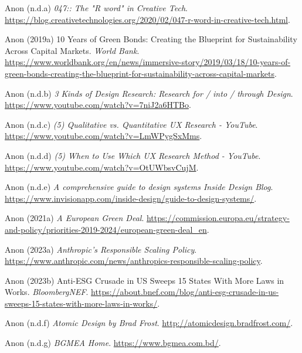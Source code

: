 \documentclass[
  letterpaper,
  DIV=11,
  numbers=noendperiod]{scrartcl}
\newlength{\cslhangindent}
\newenvironment{CSLReferences}[2] %
 {\begin{list}{}{%
  \setlength{\itemindent}{0pt}
  \setlength{\leftmargin}{0pt}
  \setlength{\parsep}{0pt}
  \ifodd #1
   \setlength{\leftmargin}{\cslhangindent}
   \setlength{\itemindent}{-1\cslhangindent}
  \fi
  \setlength{\itemsep}{#2\baselineskip}}}
 {\end{list}}
\begin{document}
\begin{CSLReferences}{0}{1}
Anon (n.d.a) \emph{047:: {The} "{R} word" in {Creative Tech}}.
\url{https://blog.creativetechnologies.org/2020/02/047-r-word-in-creative-tech.html}.

Anon (2019a) 10 {Years} of {Green Bonds}: {Creating} the {Blueprint} for
{Sustainability Across Capital Markets}. \emph{World Bank}.
\url{https://www.worldbank.org/en/news/immersive-story/2019/03/18/10-years-of-green-bonds-creating-the-blueprint-for-sustainability-across-capital-markets}.

Anon (n.d.b) \emph{3 {Kinds} of {Design Research}: {Research} for / into
/ through {Design}}. \url{https://www.youtube.com/watch?v=7niJ2a6HTBo}.

Anon (n.d.c) \emph{(5) {Qualitative} vs. {Quantitative UX Research} -
{YouTube}}. \url{https://www.youtube.com/watch?v=LmWPygSxMms}.

Anon (n.d.d) \emph{(5) {When} to {Use Which UX Research Method} -
{YouTube}}. \url{https://www.youtube.com/watch?v=OtUWbsvCujM}.

Anon (n.d.e) \emph{A comprehensive guide to design systems {\textbar}
{Inside Design Blog}}.
\url{https://www.invisionapp.com/inside-design/guide-to-design-systems/}.

Anon (2021a) \emph{A {European Green Deal}}.
\url{https://commission.europa.eu/strategy-and-policy/priorities-2019-2024/european-green-deal_en}.

Anon (2023a) \emph{Anthropic's {Responsible Scaling Policy}}.
\url{https://www.anthropic.com/news/anthropics-responsible-scaling-policy}.

Anon (2023b) Anti-{ESG Crusade} in {US Sweeps} 15 {States With More
Laws} in {Works}. \emph{BloombergNEF}.
\url{https://about.bnef.com/blog/anti-esg-crusade-in-us-sweeps-15-states-with-more-laws-in-works/}.

Anon (n.d.f) \emph{Atomic {Design} by {Brad Frost}}.
\url{http://atomicdesign.bradfrost.com/}.

Anon (n.d.g) \emph{{BGMEA} {\textbar} {Home}}.
\url{https://www.bgmea.com.bd/}.


\end{CSLReferences}
\end{document}
